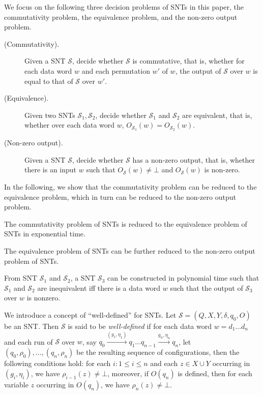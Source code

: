 \documentclass[runningheads,a4paper]{llncs}
\def\Ss{{\mathcal{S} }}
\begin{document}
We focus on the following three decision problems of SNTs in this paper, the commutativity problem, the equivalence problem, and the non-zero output problem.
\begin{description}
\item[(Commutativity).] Given a SNT $\Ss$, decide whether $\Ss$ is commutative, that is, whether for each data word $w$ and each permutation $w'$ of $w$, the output of $\Ss$ over $w$ is equal to that of $\Ss$ over $w'$.
%
\item[(Equivalence).] Given two SNTs $\Ss_1,\Ss_2$, decide whether $\Ss_1$ and $\Ss_2$ are equivalent, that is, whether over each data word $w$, $O_{\Ss_1}(w)=O_{\Ss_2}(w)$.
%
\item[(Non-zero output).] Given a SNT $\Ss$, decide whether $\Ss$ has a non-zero output, that is, whether there is an input $w$ such that $O_{\Ss}(w) \neq \bot$ and $O_{\Ss}(w)$ is non-zero. 
\end{description}
In the following, we show that the commutativity problem can be reduced to the equivalence problem, which in turn can be reduced to the non-zero output problem.


\begin{proposition}\label{prop-snt-cmm-to-eqv}
The commutativity problem of SNTs is reduced to the equivalence problem of SNTs in exponential time. 
\end{proposition}

The equivalence problem of SNTs can be further reduced to the non-zero output problem of SNTs.

\begin{proposition}\label{prop-snt-eqv-to-nzero}
From SNT $\Ss_1$ and $\Ss_2$, a SNT $\Ss_3$ can be constructed in polynomial time such that $\Ss_1$ and $\Ss_2$ are  inequivalent iff there is a data word $w$ such that the output of $\Ss_3$ over $w$ is nonzero. 
\end{proposition}

We introduce a concept of ``well-defined'' for SNTs. Let $\Ss=(Q,X,Y,\delta,q_0,O)$ be an SNT. Then $\Ss$ is said to be \emph{well-defined} if for each data word $w=d_1\dots d_n$ and each run of $\Ss$ over $w$, say  $q_0 \xrightarrow{(g_1,\eta_1)} q_1 \dots q_{n-1} \xrightarrow{g_n,\eta_n} q_n$, let $(q_0,\rho_0),\dots,(q_n,\rho_n)$ be the resulting sequence of configurations, then the following conditions hold: for each $i: 1 \le i \le n$ and each $z \in X \cup Y$ occurring in $(g_i,\eta_i)$, we have $\rho_{i-1}(z) \neq \bot$, moreover, if $O(q_n)$ is defined, then for each variable $z$ occurring in $O(q_n)$, we have $\rho_{n}(z) \neq \bot$.
\end{document}
